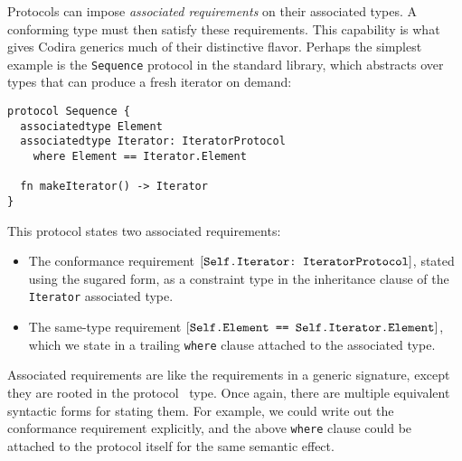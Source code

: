 \documentclass[../generics]{subfiles}
\begin{document}
Protocols can impose \emph{associated requirements} on their associated types. A conforming type must then satisfy these requirements. This capability is what gives Codira generics much of their distinctive flavor. Perhaps the simplest example is the \texttt{Sequence} protocol in the standard library, which abstracts over types that can produce a fresh iterator on demand:
\begin{Verbatim}
protocol Sequence {
  associatedtype Element
  associatedtype Iterator: IteratorProtocol
    where Element == Iterator.Element

  fn makeIterator() -> Iterator
}
\end{Verbatim}
This protocol states two associated requirements:
\begin{itemize}
\item The conformance requirement $[\texttt{Self.Iterator:~IteratorProtocol}]$, stated using the sugared form, as a constraint type in the inheritance clause of the \texttt{Iterator} associated type.
\item The same-type requirement $[\texttt{Self.Element == Self.Iterator.Element}]$, which we state in a trailing \texttt{where} clause attached to the associated type.
\end{itemize}
Associated requirements are like the requirements in a generic signature, except they are rooted in the \IndexSelf protocol \tSelf\ type. Once again, there are multiple equivalent syntactic forms for stating them. For example, we could write out the conformance requirement explicitly, and the above \texttt{where} clause could be attached to the protocol itself for the same semantic effect.
\end{document}
